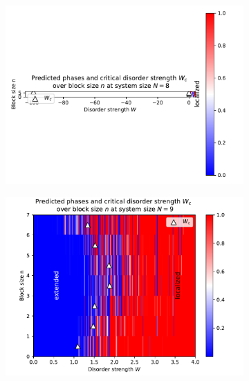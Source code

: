 \documentclass[reprint,amsmath,amssymb,aps,prb]{revtex4-2}
\begin{document}
\onecolumngrid
\begin{center}%
	\begin{figure}[H]
		\centering	
		\begin{subfigure}[c]{0.45\textwidth}
			\includegraphics[width=\textwidth]{../results/Wc/N8_Wc_n_dependency.pdf}
		\end{subfigure}
		\begin{subfigure}[c]{0.45\textwidth}
			\includegraphics[width=\textwidth]{../results/Wc/N9_Wc_n_dependency.pdf}
		\end{subfigure}
		\begin{subfigure}[c]{0.45\textwidth}

\end{subfigure}
\end{figure}
\end{center}
\end{document}
